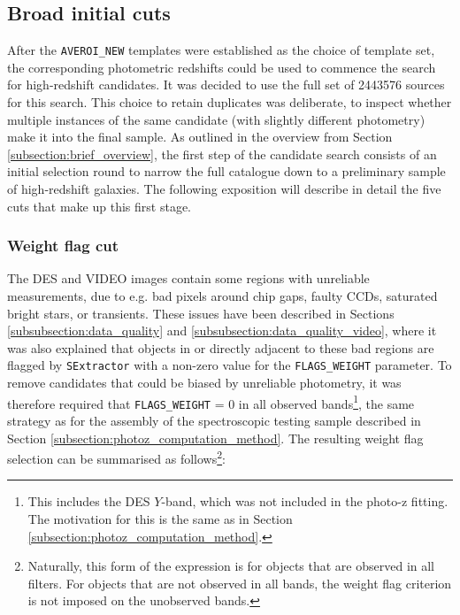 \subsection{Broad initial cuts}\label{subsection:broad_cuts}
After the \texttt{AVEROI\_NEW} templates were established as the choice of template set, the corresponding photometric redshifts could be used to commence the search for high-redshift candidates. It was decided to use the full set of \num{2 443 576} \DESVIDEO sources for this search. This choice to retain duplicates was deliberate, to inspect whether multiple instances of the same candidate (with slightly different photometry) make it into the final sample. As outlined in the overview from Section \ref{subsection:brief_overview}, the first step of the candidate search consists of an initial selection round to narrow the full \DESVIDEO catalogue down to a preliminary sample of high-redshift galaxies. The following exposition will describe in detail the five cuts that make up this first stage. \par 


\subsubsection{Weight flag cut}\label{subsubsection:weight_flag_cut}
The DES and VIDEO images contain some regions with unreliable measurements, due to e.g. bad pixels around chip gaps, faulty CCDs, saturated bright stars, or transients. These issues have been described in Sections \ref{subsubsection:data_quality} and \ref{subsubsection:data_quality_video}, where it was also explained that objects in or directly adjacent to these bad regions are flagged by \texttt{SExtractor} with a non-zero value for the \texttt{FLAGS\_\allowbreak WEIGHT} parameter. To remove candidates that could be biased by unreliable photometry, it was therefore required that \texttt{FLAGS\_\allowbreak WEIGHT} = 0 in all observed bands\footnote{This includes the DES $Y$-band, which was not included in the photo-z fitting. The motivation for this is the same as in Section \ref{subsection:photoz_computation_method}.}, the same strategy as for the assembly of the spectroscopic testing sample described in Section \ref{subsection:photoz_computation_method}. The resulting weight flag selection can be summarised as follows\footnote{Naturally, this form of the expression is for objects that are observed in all filters. For objects that are not observed in all bands, the weight flag criterion is not imposed on the unobserved bands.}:

